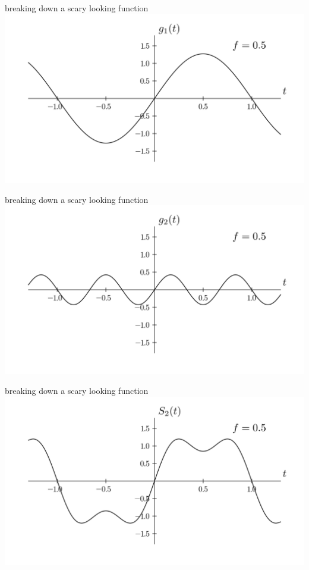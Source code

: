 \documentclass{beamer}
\begin{document}
	\begin{frame}{breaking down a scary looking function}
		\includegraphics[width=\linewidth,height=0.85\textheight,keepaspectratio]{../assets/first-term-function.png}
	\end{frame}

	\begin{frame}{breaking down a scary looking function}
		\includegraphics[width=\linewidth,height=0.85\textheight,keepaspectratio]{../assets/second-term-function.png}
	\end{frame}
	
	\begin{frame}{breaking down a scary looking function}
		\includegraphics[width=\linewidth,height=0.85\textheight,keepaspectratio]{../assets/sum-two-terms.png}
	\end{frame}
	
\end{document}
